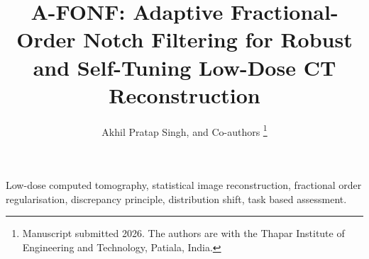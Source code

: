 \documentclass[journal]{IEEEtran}
\begin{document}
\title{A-FONF: Adaptive Fractional-Order Notch Filtering for Robust and
Self-Tuning Low-Dose CT Reconstruction}

\author{Akhil Pratap Singh, and Co-authors%
\thanks{Manuscript submitted 2026. The authors are with the Thapar Institute
of Engineering and Technology, Patiala, India.}}

\maketitle

\begin{abstract}
\end{abstract}

\begin{IEEEkeywords}
Low-dose computed tomography, statistical image reconstruction, fractional
order regularisation, discrepancy principle, distribution shift, task based
assessment.
\end{IEEEkeywords}









\end{document}
